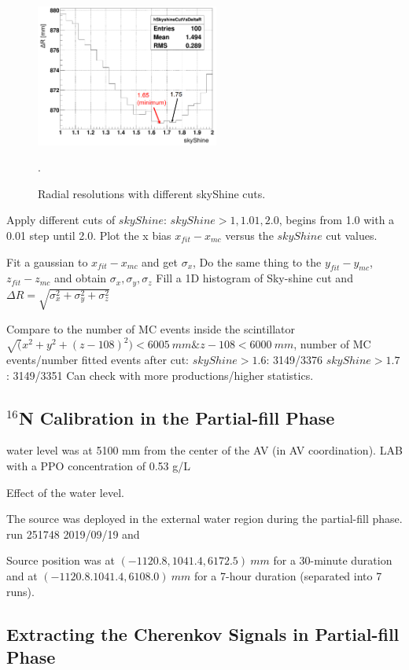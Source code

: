 \begin{figure}
	\centering
	\includegraphics[width=60mm]{skyShineCuts.png}
	\caption{ Radial resolutions with different skyShine cuts.}
	\label{skySHineCutVsFitResol}.
\end{figure}

Apply different cuts of $skyShine$: $skyShine>1, 1.01, 2.0$, begins from 1.0 with a 0.01 step until 2.0.
Plot the x bias $x_{fit}-x_{mc}$ versus the $skyShine$ cut values.

Fit	a gaussian to $x_{fit} - x_{mc}$ and get $\sigma_x$,
Do the same thing to the $y_{fit} - y_{mc}$, $z_{fit} - z_{mc}$ and	obtain	$\sigma_x, \sigma_y, \sigma_z$
Fill a 1D histogram of Sky-shine cut and
$\Delta R= \sqrt{\sigma^2_x+\sigma^2_y+\sigma^2_z}$

Compare to the number of MC events inside the scintillator $\sqrt(x^2+y^2+(z-108)^2)<6005~mm \& z-108<6000~mm$, number of MC events/number fitted events after cut:
$skyShine>1.6$: 3149/3376
$skyShine>1.7$: 3149/3351
Can check with more productions/higher statistics.

\subsection{$^{16}$N Calibration in the Partial-fill Phase}

water level was at 5100 mm from the center of the AV (in AV coordination).
LAB with a PPO concentration of 0.53 g/L  

Effect of the water level.

The  source was deployed in the external water region during the partial-fill phase.
run 251748 2019/09/19 and 

Source position was at $(-1120.8, 1041.4, 6172.5)~ mm$ for a 30-minute duration and at $(-1120.8. 1041.4, 6108.0)~mm$ for a 7-hour duration (separated into 7 runs).


\subsection{Extracting the Cherenkov Signals in Partial-fill Phase}

